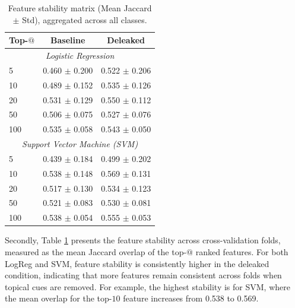 \documentclass[11pt]{article}
\begin{document}
\begin{table}[t]
    \centering
    \label{tab:feature_stability_stacked}
    \begin{tabular}{lcc}
    \hline
    \textbf{Top-$@$} & \textbf{Baseline} & \textbf{Deleaked} \\
    \hline
    \multicolumn{3}{c}{\textit{Logistic Regression}} \\
    \hline
    5   & 0.460 $\pm$ 0.200 & 0.522 $\pm$ 0.206 \\
    10  & 0.489 $\pm$ 0.152 & 0.535 $\pm$ 0.126 \\
    20  & 0.531 $\pm$ 0.129 & 0.550 $\pm$ 0.112 \\
    50  & 0.506 $\pm$ 0.075 & 0.527 $\pm$ 0.076 \\
    100 & 0.535 $\pm$ 0.058 & 0.543 $\pm$ 0.050  \\
    \hline
    \multicolumn{3}{c}{\textit{Support Vector Machine (SVM)}} \\
    \hline
    5   & 0.439 $\pm$ 0.184 & 0.499 $\pm$ 0.202 \\
    10  & 0.538 $\pm$ 0.148 & 0.569 $\pm$ 0.131 \\
    20  & 0.517 $\pm$ 0.130 & 0.534 $\pm$ 0.123 \\
    50  & 0.521 $\pm$ 0.083 & 0.530 $\pm$ 0.081 \\
    100 & 0.538 $\pm$ 0.054 & 0.555 $\pm$ 0.053 \\
    \hline
    \end{tabular}
    \caption{Feature stability matrix (Mean Jaccard $\pm$ Std), aggregated across all classes.}
\end{table}
Secondly, Table \ref{tab:feature_stability_stacked} presents the feature stability across cross-validation folds, measured as the mean Jaccard overlap of the top-$@$ ranked features. For both LogReg and SVM, feature stability is consistently higher in the deleaked condition, indicating that more features remain consistent across folds when topical cues are removed. For example, the highest stability is for SVM, where the mean overlap for the top-$10$ feature increases from 0.538 to 0.569. 
\end{document}

